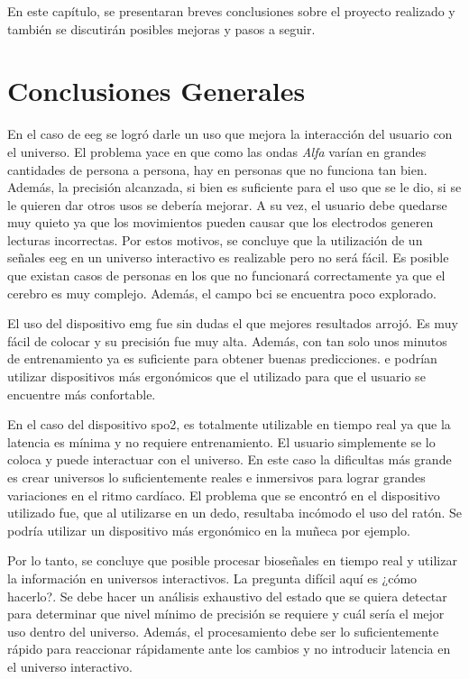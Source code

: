En este capítulo, se presentaran breves conclusiones sobre el proyecto realizado y también se discutirán posibles mejoras y pasos a seguir.

\section{Conclusiones Generales}

En el caso de \acrshort{eeg} se logró darle un uso que mejora la interacción del usuario con el universo. El problema yace en que como las ondas \emph{Alfa} varían en grandes cantidades de persona a persona, hay en personas que no funciona tan bien. Además, la precisión alcanzada, si bien es suficiente para el uso que se le dio, si se le quieren dar otros usos se debería mejorar. A su vez, el usuario debe quedarse muy quieto ya que los movimientos pueden causar que los electrodos generen lecturas incorrectas. Por estos motivos, se concluye que la utilización de un señales \acrshort{eeg} en un universo interactivo es realizable pero no será fácil. Es posible que existan casos de personas en los que no funcionará correctamente ya que el cerebro es muy complejo. Además, el campo \acrshort{bci} se encuentra poco explorado.

El uso del dispositivo \acrshort{emg} fue sin dudas el que mejores resultados arrojó. Es muy fácil de colocar y su precisión fue muy alta. Además, con tan solo unos minutos de entrenamiento ya es suficiente para obtener buenas predicciones. e podrían utilizar dispositivos más ergonómicos que el utilizado para que el usuario se encuentre más confortable.

En el caso del dispositivo \acrshort{spo2}, es totalmente utilizable en tiempo real ya que la latencia es mínima y no requiere entrenamiento. El usuario simplemente se lo coloca y puede interactuar con el universo. En este caso la dificultas más grande es crear universos lo suficientemente reales e inmersivos para lograr grandes variaciones en el ritmo cardíaco. El problema que se encontró en el dispositivo utilizado fue, que al utilizarse en un dedo, resultaba incómodo el uso del ratón. Se podría utilizar un dispositivo más ergonómico en la muñeca por ejemplo.

Por lo tanto, se concluye que posible procesar bioseñales en tiempo real y utilizar la información en universos interactivos. La pregunta difícil aquí es ¿cómo hacerlo?. Se debe hacer un análisis exhaustivo del estado que se quiera detectar para determinar que nivel mínimo de precisión se requiere y cuál sería el mejor uso dentro del universo. Además, el procesamiento debe ser lo suficientemente rápido para reaccionar rápidamente ante los cambios y no introducir latencia en el universo interactivo.

